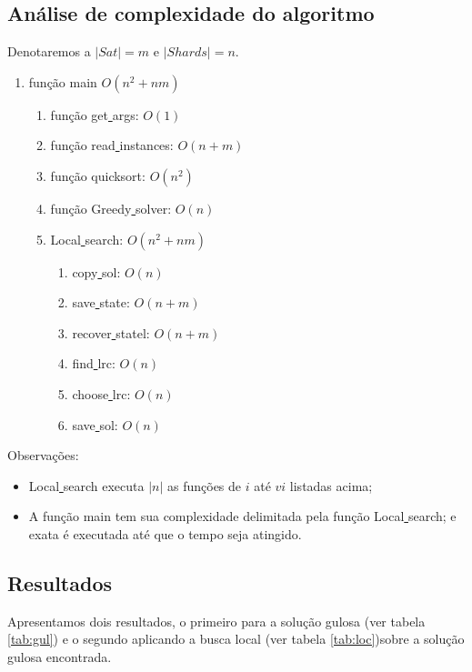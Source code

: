 \documentclass[11pt,letterpaper]{article}
\begin{document}
\subsection{Análise de complexidade do algoritmo}
Denotaremos a $|Sat|= m $ e $|Shards|= n $. 

\begin{enumerate}
\item função main $O(n^2+nm)$
  \begin{enumerate}
  \item função get\underline{ }args: $O(1)$
  \item função read\underline{ }instances: $O(n+m)$
  \item função quicksort: $O(n^2)$ 
  \item função Greedy\underline{ }solver: $O(n)$
  \item  Local\underline{ }search: $O(n^2+nm)$
    \begin{enumerate}
    \item copy\underline{ }sol: $O(n)$
    \item save\underline{ }state: $O(n+m)$
    \item recover\underline{ }statel: $O(n+m)$
    \item find\underline{ }lrc: $O(n)$
    \item choose\underline{ }lrc: $O(n)$
    \item save\underline{ }sol: $O(n)$ 
    \end{enumerate}
  \end{enumerate}
\end{enumerate}

Observações:
\begin{itemize}
\item Local\underline{ }search executa $|n|$ as  funções de $i$ até $vi$
  listadas acima;

\item A função main tem sua complexidade delimitada pela função
  Local\underline{ }search; e exata é executada até
  que o tempo seja atingido.
\end{itemize}

\subsection{Resultados}

Apresentamos dois resultados, o primeiro para a solução gulosa (ver
tabela \ref{tab:gul}) e o segundo
aplicando a busca local (ver
tabela \ref{tab:loc})sobre a solução gulosa encontrada.
\end{document}
